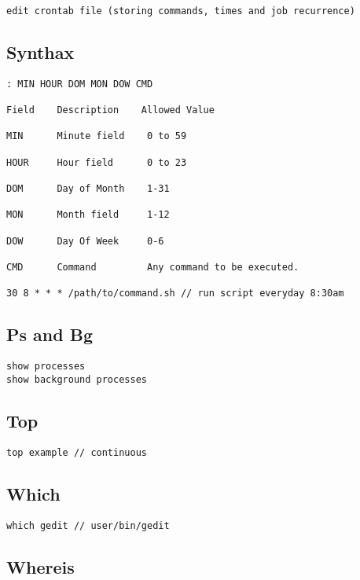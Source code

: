 \begin{verbatim}
edit crontab file (storing commands, times and job recurrence)
\end{verbatim}

\subsection{Synthax}

\begin{verbatim}
: MIN HOUR DOM MON DOW CMD

Field    Description    Allowed Value

MIN      Minute field    0 to 59

HOUR     Hour field      0 to 23

DOM      Day of Month    1-31

MON      Month field     1-12

DOW      Day Of Week     0-6

CMD      Command         Any command to be executed.

30 8 * * * /path/to/command.sh // run script everyday 8:30am
\end{verbatim}

\subsection{Ps and Bg}

\begin{verbatim}
show processes
show background processes
\end{verbatim}

\subsection{Top}
\begin{verbatim}
top example // continuous
\end{verbatim}

\subsection{Which}

\begin{verbatim}
which gedit // user/bin/gedit 
\end{verbatim}

\subsection{Whereis}

